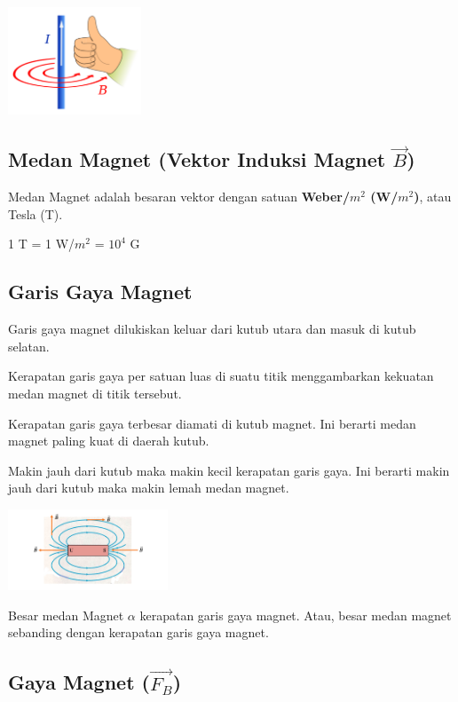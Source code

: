 \documentclass[twocolumn, 11pt]{article}%
\begin{document}
    \begin{center}
        \includegraphics[width=150px]{3.png}
    \end{center}

\subsection{Medan Magnet (Vektor Induksi Magnet $\vec B$)}%
    Medan Magnet adalah besaran vektor dengan satuan \textbf{Weber/$m^2$
    (W/$m^2$)}, atau Tesla (T).

    \begin{center}
    1 T = 1 W/$m^2$ = $10^4$ G
    \end{center}

\subsection{Garis Gaya Magnet}%
Garis gaya magnet dilukiskan keluar dari kutub utara dan masuk di kutub selatan.

Kerapatan garis gaya per satuan luas di suatu titik menggambarkan kekuatan medan magnet di titik tersebut.

Kerapatan garis gaya terbesar diamati di kutub magnet. Ini berarti medan magnet paling kuat di daerah kutub.

Makin jauh dari kutub maka makin kecil kerapatan garis gaya. Ini berarti makin jauh dari kutub maka makin lemah medan magnet.

\begin{center}
    \includegraphics[width=180px]{4.png}
\end{center}

Besar medan Magnet $\alpha$ kerapatan garis gaya magnet. Atau, besar medan magnet sebanding dengan kerapatan garis gaya magnet.

\subsection{Gaya Magnet ($\overrightarrow{F_B}$)}%
\end{document}
